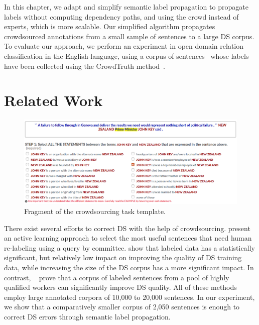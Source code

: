 In this chapter, we adapt and simplify semantic label propagation to propagate labels without computing dependency paths, and using the crowd instead of experts, which is more scalable. Our simplified algorithm propagates crowdsourced annotations from a small sample of sentences to a large DS corpus. To evaluate our approach, we perform an experiment in open domain relation classification in the English-language, using a corpus of sentences~\cite{dumitrache2017false} whose labels have been collected using the CrowdTruth method~\cite{aroyo2014threesides}.


\section{Related Work}

\begin{figure}[t!]
\centering
\includegraphics[width=\textwidth]{img/odrelex.png}
\caption{Fragment of the crowdsourcing task template.}
\label{fig:template}
\end{figure}

There exist several efforts to correct DS with the help of crowdsourcing. \citet{angeli2014combining} present an active learning approach to select the most useful sentences that need human re-labeling using a query by committee. \citet{zhang2012big} show that labeled data has a statistically significant, but relatively low impact on improving the quality of DS training data, while increasing the size of the DS corpus has a more significant impact. In contrast, ~\citet{liu2016effective} prove that a corpus of labeled sentences from a pool of highly qualified workers can significantly improve DS quality. All of these methods employ large annotated corpora of 10,000 to 20,000 sentences. In our experiment, we show that a comparatively smaller corpus of 2,050 sentences is enough to correct DS errors through semantic label propagation.

